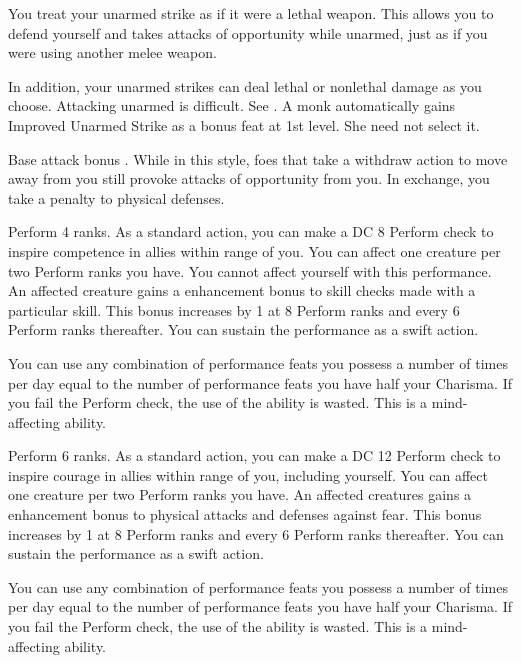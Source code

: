  You treat your unarmed strike as if it were a lethal weapon. This allows you to defend yourself and takes attacks of opportunity while unarmed, just as if you were using another melee weapon.

In addition, your unarmed strikes can deal lethal or nonlethal damage as you choose.
 Attacking unarmed is difficult. See .
 A monk automatically gains Improved Unarmed Strike as a bonus feat at 1st level. She need not select it.

\featpre Base attack bonus .
\featben While in this style, foes that take a withdraw action to move away from you still provoke attacks of opportunity from you. In exchange, you take a  penalty to physical defenses.

\featpre Perform 4 ranks.
\featben As a standard action, you can make a DC 8 Perform check to inspire competence in allies within \rngmed range of you. You can affect one creature per two Perform ranks you have. You cannot affect yourself with this performance. An affected creature gains a  enhancement bonus to skill checks made with a particular skill. This bonus increases by 1 at 8 Perform ranks and every 6 Perform ranks thereafter. You can sustain the performance as a swift action.

You can use any combination of performance feats you possess a number of times per day equal to the number of performance feats you have \add half your Charisma. If you fail the Perform check, the use of the ability is wasted. This is a mind-affecting ability.

\featpre Perform 6 ranks.
\featben As a standard action, you can make a DC 12 Perform check to inspire courage in allies within \rngmed range of you, including yourself. You can affect one creature per two Perform ranks you have. An affected creatures gains a  enhancement bonus to physical attacks and defenses against fear. This bonus increases by 1 at 8 Perform ranks and every 6 Perform ranks thereafter. You can sustain the performance as a swift action.

You can use any combination of performance feats you possess a number of times per day equal to the number of performance feats you have \add half your Charisma. If you fail the Perform check, the use of the ability is wasted. This is a mind-affecting ability.

